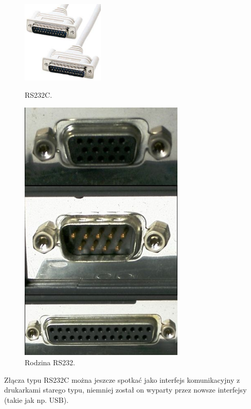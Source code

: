 \documentclass{BscUS}
\begin{document}
\begin{figure}[H]
\centering
\parbox{5cm}{
\includegraphics[width=0.35\textwidth]{./img/rs232C}
\caption{RS232C. \cite{RS232C}}
\label{fig:RS232C}}
\qquad
\begin{minipage}{5cm}
\centering
\includegraphics[width=0.7\textwidth]{./img/rs232family}
\caption{Rodzina RS232. \cite{RS232family}}
\label{fig:RS232Family}
\end{minipage}
\end{figure}
\noindent Złącza typu RS232C można jeszcze spotkać jako interfejs komunikacyjny z~ drukarkami starego typu, niemniej został on wyparty przez nowsze interfejsy (takie jak np. USB). \\
\end{document}
